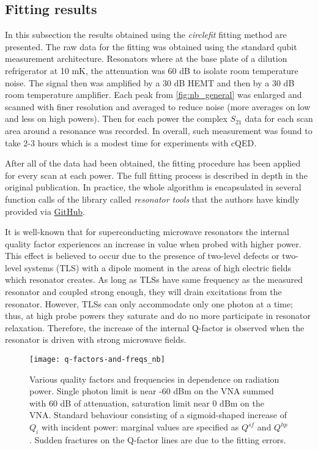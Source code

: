 \documentclass[12pt]{article}
\numberwithin{equation}{section}
\numberwithin{figure}{section}
\begin{document}
\subsection{Fitting results}

In this subsection the results obtained using the \textit{circlefit} fitting method are presented.
The raw data for the fitting was obtained using the standard qubit measurement architecture. Resonators where at the base plate of a dilution refrigerator at 10 mK, the attenuation was 60 dB to isolate room temperature noise. The signal then was amplified by a 30 dB HEMT and then by a 30 dB room temperature amplifier. Each peak from \autoref{fig:nb_general} was enlarged and scanned with finer resolution and averaged to reduce noise (more averages on low and less on high powers). Then for each power the complex $S_{21}$ data for each scan area around a resonance was recorded. In overall, such measurement was found to take 2-3 hours which is a modest time for experiments with cQED.

After all of the data had been obtained, the fitting procedure has been applied for every scan at each power. The full fitting process is described in depth in the original publication\cite{probst2015}. In practice, the whole algorithm is encapsulated in several function calls of the library called \textit{resonator tools} that the authors have kindly provided via \href{https://github.com/sebastianprobst/resonatortools}{GitHub}.

It is well-known\cite{wang2009} that for superconducting microwave resonators the internal quality factor experiences an increase in value when probed with higher power. This effect is believed to occur due to the presence of two-level defects or two-level systems (TLS) with a dipole moment in the areas of high electric fields which resonator creates. As long as TLSs have same frequency as the measured resonator and coupled strong enough, they will drain excitations from the resonator. However, TLSs can only accommodate only one photon at a time; thus, at high probe powers they saturate and do no more participate in resonator relaxation. Therefore, the increase of the internal Q-factor is observed when the resonator is driven with strong microwave fields.

\begin{figure}

\hspace{-0.7cm}
\texttt{[image: q-factors-and-freqs\_nb]}
\caption{Various quality factors and frequencies in dependence on radiation power. Single photon limit is near -60 dBm on the VNA summed with 60 dB of attenuation, saturation limit near 0 dBm on the VNA. Standard behaviour consisting of a sigmoid-shaped increase of $Q_i$ with incident power: marginal values are specified as $Q^{sf}$ and $Q^{hp}$. Sudden fractures on the Q-factor lines are due to the fitting errors.}
\label{fig:q_factors_nb}
\end{figure}
\end{document}
